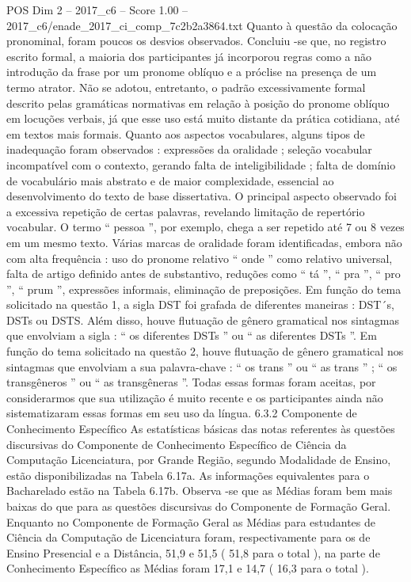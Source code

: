 \begin{textsample}{POS Dim 2 – 2017\_c6 – Score 1.00 – 2017\_c6/enade\_2017\_ci\_comp\_7c2b2a3864.txt}
Quanto à questão da colocação pronominal, foram poucos os desvios observados.
Concluiu -se que, no registro escrito formal, a maioria dos participantes já incorporou regras como a não introdução da frase por um pronome oblíquo e a próclise na presença de um termo atrator.
Não se adotou, entretanto, o padrão excessivamente formal descrito pelas gramáticas normativas em relação à posição do pronome oblíquo em locuções verbais, já que esse uso está muito distante da prática cotidiana, até em textos mais formais.
Quanto aos aspectos vocabulares, alguns tipos de inadequação foram observados : expressões da oralidade ; seleção vocabular incompatível com o contexto, gerando falta de inteligibilidade ; falta de domínio de vocabulário mais abstrato e de maior complexidade, essencial ao desenvolvimento do texto de base dissertativa.
O principal aspecto observado foi a excessiva repetição de certas palavras, revelando limitação de repertório vocabular.
O termo “ pessoa ”, por exemplo, chega a ser repetido até 7 ou 8 vezes em um mesmo texto.
Várias marcas de oralidade foram identificadas, embora não com alta frequência : uso do pronome relativo “ onde ” como relativo universal, falta de artigo definido antes de substantivo, reduções como “ tá ”, “ pra ”, “ pro ”, “ prum ”, expressões informais, eliminação de preposições.
Em função do tema solicitado na questão 1, a sigla DST foi grafada de diferentes maneiras : DST´s, DSTs ou DSTS.
Além disso, houve flutuação de gênero gramatical nos sintagmas que envolviam a sigla : “ os diferentes DSTs ” ou “ as diferentes DSTs ”.
Em função do tema solicitado na questão 2, houve flutuação de gênero gramatical nos sintagmas que envolviam a sua palavra-chave : “ os trans ” ou “ as trans ” ; “ os transgêneros ” ou “ as transgêneras ”.
Todas essas formas foram aceitas, por considerarmos que sua utilização é muito recente e os participantes ainda não sistematizaram essas formas em seu uso da língua. 6.3.2 Componente de Conhecimento Específico As estatísticas básicas das notas referentes às questões discursivas do Componente de Conhecimento Específico de Ciência da Computação Licenciatura, por Grande Região, segundo Modalidade de Ensino, estão disponibilizadas na Tabela 6.17a.
As informações equivalentes para o Bacharelado estão na Tabela 6.17b.
Observa -se que as Médias foram bem mais baixas do que para as questões discursivas do Componente de Formação Geral.
Enquanto no Componente de Formação Geral as Médias para estudantes de Ciência da Computação de Licenciatura foram, respectivamente para os de Ensino Presencial e a Distância, 51,9 e 51,5 ( 51,8 para o total ), na parte de Conhecimento Específico as Médias foram 17,1 e 14,7 ( 16,3 para o total ).

\end{textsample}
